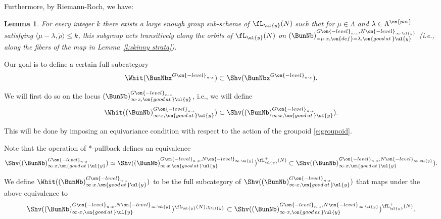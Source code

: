 \documentclass[9pt]{amsart}
\newtheorem{lem}[subsubsection]{Lemma}
\theoremstyle{definition}
\theoremstyle{remark}
\newcommand{\lemref}[1]{Lemma~\ref{#1}}
\numberwithin{equation}{section}
\begin{document}
Furthermore, by Riemann-Roch, we have:

\begin{lem}   \label{l:skinny strata bis}
For every integer $k$ there exists a large enough group sub-scheme of $\fL_{\ul{y}}(N)$
such that for $\mu\in \Lambda$ and $\lambda\in \Lambda^{\on{pos}}$ satisfying 
$\langle \mu-\lambda,\check\rho\rangle\leq k$, this subgroup acts transitively along the orbits 
of $\fL_{\ul{y}}(N)$ on $(\BunNb)^{G\on{-level}_{n\cdot x},N\on{-level}_{\infty\cdot \ul{y}}}_{=\mu\cdot x,\on{def}=\lambda,\on{good\,at\,}\ul{y}}$
(i.e., along the fibers of the map in \lemref{l:skinny strata}). 
\end{lem}

 

Our goal is to define a certain full subcategory
$$\Whit(\BunNbx^{G\on{-level}_{n\cdot x}})\subset \Shv(\BunNbx^{G\on{-level}_{n\cdot x}}).$$

\medskip

We will first do so on the locus $(\BunNb)_{\infty\cdot x,\on{good\,at\,}\ul{y}}^{G\on{-level}_{n\cdot x}}$, 
i.e., we will define 
$$\Whit((\BunNb)_{\infty\cdot x,\on{good\,at\,}\ul{y}}^{G\on{-level}_{n\cdot x}})
\subset \Shv((\BunNb)_{\infty\cdot x,\on{good\,at\,}\ul{y}}^{G\on{-level}_{n\cdot x}}).$$

This will be done by imposing an equivariance condition with respect to the action of the groupoid \eqref{e:groupoid}. 

\sssec{}

Note that the operation of *-pullback defines an equivalence
$$\Shv((\BunNb)_{\infty\cdot x,\on{good\,at\,}\ul{y}}^{G\on{-level}_{n\cdot x}})\simeq 
\Shv((\BunNb)^{G\on{-level}_{n\cdot x},N\on{-level}_{\infty\cdot \ul{y}}}_{\infty\cdot x,\on{good\,at\,}\ul{y}})^{\fL^+_{\ul{y}}(N)}
\subset \Shv((\BunNb)^{G\on{-level}_{n\cdot x},N\on{-level}_{\infty\cdot \ul{y}}}_{\infty\cdot x,\on{good\,at\,}\ul{y}}).$$

\medskip

We define $\Whit((\BunNb)_{\infty\cdot x,\on{good\,at\,}\ul{y}}^{G\on{-level}_{n\cdot x}})$ to be the full subcategory of 
$\Shv((\BunNb)_{\infty\cdot x,\on{good\,at\,}\ul{y}}^{G\on{-level}_{n\cdot x}})$ that maps under the above equivalence to 
$$\Shv((\BunNb)^{G\on{-level}_{n\cdot x},N\on{-level}_{\infty\cdot \ul{y}}}_{\infty\cdot x,\on{good\,at\,}\ul{y}})^{\fL_{\ul{y}}(N),\chi_{\ul{y}}}
\subset 
\Shv((\BunNb)^{G\on{-level}_{n\cdot x},N\on{-level}_{\infty\cdot \ul{y}}}_{\infty\cdot x,\on{good\,at\,}\ul{y}})^{\fL^+_{\ul{y}}(N)}.$$
\end{document}
